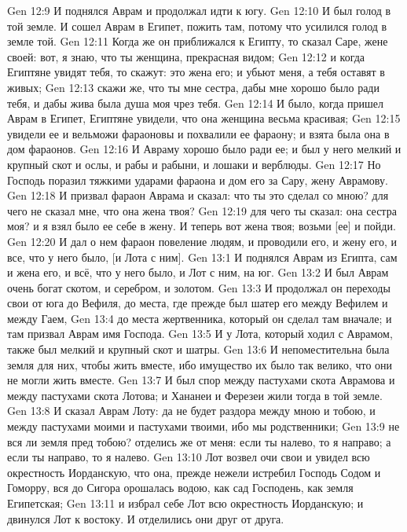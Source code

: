 \vs Gen 12:9 И поднялся Аврам и продолжал идти к югу.
\rsbpar\vs Gen 12:10 И был голод в той земле. И сошел Аврам в Египет, пожить там, потому что усилился голод в земле той.
\vs Gen 12:11 Когда же он приближался к Египту, то сказал Саре, жене своей: вот, я знаю, что ты женщина, прекрасная видом;
\vs Gen 12:12 и когда Египтяне увидят тебя, то скажут: это жена его; и убьют меня, а тебя оставят в живых;
\vs Gen 12:13 скажи же, что ты мне сестра, дабы мне хорошо было ради тебя, и дабы жива была душа моя чрез тебя.
\vs Gen 12:14 И было, когда пришел Аврам в Египет, Египтяне увидели, что она женщина весьма красивая;
\vs Gen 12:15 увидели ее и вельможи фараоновы и похвалили ее фараону; и взята была она в дом фараонов.
\vs Gen 12:16 И Авраму хорошо было ради ее; и был у него мелкий и крупный скот и ослы, и рабы и рабыни, и лошаки и верблюды.
\vs Gen 12:17 Но Господь поразил тяжкими ударами фараона и дом его за Сару, жену Аврамову.
\vs Gen 12:18 И призвал фараон Аврама и сказал: что ты это сделал со мною? для чего не сказал мне, что она жена твоя?
\vs Gen 12:19 для чего ты сказал: она сестра моя? и я взял было ее себе в жену. И теперь вот жена твоя; возьми [ее] и пойди.
\vs Gen 12:20 И дал о нем фараон повеление людям, и проводили его, и жену его, и все, что у него было, [и Лота с ним].
\vs Gen 13:1 И поднялся Аврам из Египта, сам и жена его, и всё, что у него было, и Лот с ним, на юг.
\vs Gen 13:2 И был Аврам очень богат скотом, и серебром, и золотом.
\vs Gen 13:3 И продолжал он переходы свои от юга до Вефиля, до места, где прежде был шатер его между Вефилем и между Гаем,
\vs Gen 13:4 до места жертвенника, который он сделал там вначале; и там призвал Аврам имя Господа.
\rsbpar\vs Gen 13:5 И у Лота, который ходил с Аврамом, также был мелкий и крупный скот и шатры.
\vs Gen 13:6 И непоместительна была земля для них, чтобы жить вместе, ибо имущество их было так велико, что они не могли жить вместе.
\vs Gen 13:7 И был спор между пастухами скота Аврамова и между пастухами скота Лотова; и Хананеи и Ферезеи жили тогда в той земле.
\vs Gen 13:8 И сказал Аврам Лоту: да не будет раздора между мною и тобою, и между пастухами моими и пастухами твоими, ибо мы родственники;
\vs Gen 13:9 не вся ли земля пред тобою? отделись же от меня: если ты налево, то я направо; а если ты направо, то я налево.
\vs Gen 13:10 Лот возвел очи свои и увидел всю окрестность Иорданскую, что она, прежде нежели истребил Господь Содом и Гоморру, вся до Сигора орошалась водою, как сад Господень, как земля Египетская;
\vs Gen 13:11 и избрал себе Лот всю окрестность Иорданскую; и двинулся Лот к востоку. И отделились они друг от друга.

